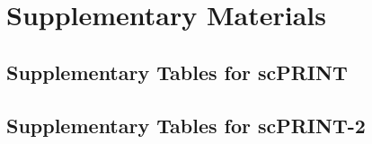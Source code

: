 \chapter*{Supplementary Materials}
\setcounter{section}{0}
\renewcommand{\thesection}{\Alph{section}}
\section{Supplementary Tables for scPRINT}
\label{sec:suppscprint}



\section{Supplementary Tables for scPRINT-2}
\label{sec:suppscprint2}


